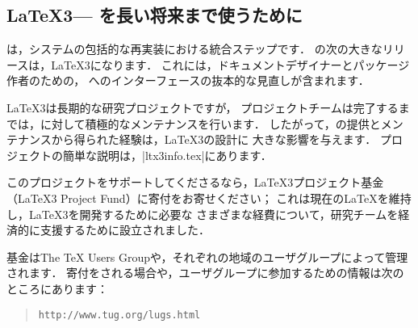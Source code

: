 \documentclass{ltxguide}[2001/05/28]
\begin{document}
\subsection{\LaTeX3--- \protect{\LaTeX{}}を長い将来まで使うために}
\label{Sec:ltx3}

\LaTeXe{}は，\LaTeXe{}システムの包括的な再実装における統合ステップです．
\LaTeXe{}の次の大きなリリースは，\LaTeX3{}になります．
これには，ドキュメントデザイナーとパッケージ作者のための，
\LaTeXe{}へのインターフェースの抜本的な見直しが含まれます．

\LaTeX3{}は長期的な研究プロジェクトですが，
プロジェクトチームは完了するまでは，\LaTeXe{}に対して積極的なメンテナンスを行います．
したがって，\LaTeXe{}の提供とメンテナンスから得られた経験は，\LaTeX3{}の設計に
大きな影響を与えます．
プロジェクトの簡単な説明は，|ltx3info.tex|にあります．

このプロジェクトをサポートしてくださるなら，\LaTeX3{}プロジェクト基金（\LaTeX3 Project Fund）に寄付をお寄せください；
これは現在の\LaTeX{}を維持し，\LaTeX3{}を開発するために必要な
さまざまな経費について，研究チームを経済的に支援するために設立されました．

基金はThe \TeX{} Users Groupや，それぞれの地域のユーザグループによって管理されます．
寄付をされる場合や，ユーザグループに参加するための情報は次のところにあります：
\begin{quote}\small\label{addrs}
   \texttt{http://www.tug.org/lugs.html}
\end{quote}
\end{document}
